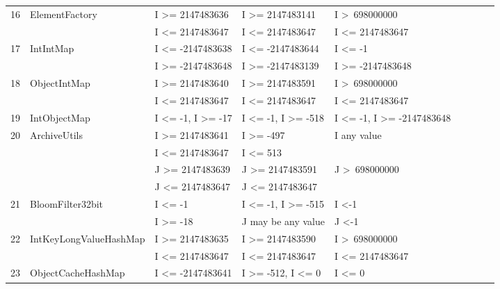 \documentclass[runningheads,a4paper]{llncs}
\begin{document}
\begin{table}[h]
{{\begin{tabular}{|l|l|l|l|l|l|l|l|l|}
16	& ElementFactory				& I \textgreater= 2147483636				& I \textgreater= 2147483141			& I \textgreater~698000000					\\ 
	&                                             & I \textless= 2147483647					& I \textless= 2147483647				& I \textless= 2147483647  					\\	
17	& IntIntMap					& I \textless= -2147483638					& I \textless= -2147483644				& I \textless= -1								\\ 
	&                                             & I \textgreater= -2147483648				& I \textgreater= -2147483139			& I \textgreater= -2147483648 				\\	
18	& ObjectIntMap				& I \textgreater= 2147483640				& I \textgreater= 2147483591			& I \textgreater~698000000					\\ 
	&                                             & I \textless= 2147483647					& I \textless= 2147483647				& I \textless= 2147483647					\\	
19	& IntObjectMap				& I \textless= -1, I \textgreater= -17			& I \textless= -1, I \textgreater= -518		& I \textless= -1, I \textgreater= -2147483648\\ 
20	& ArchiveUtils				& I \textgreater= 2147483641				& I \textgreater= -497					& I any value									\\ 
	&							&  I \textless= 2147483647					& I \textless= 513						& 											\\ 
	&                                             & J \textgreater= 2147483639				& J \textgreater= 2147483591			& J \textgreater~698000000 	   				\\
	&                                             &  J \textless= 2147483647					&  J \textless= 2147483647				&  	   										\\
21	& BloomFilter32bit 			& I \textless= -1								& I \textless= -1, I \textgreater= -515		& I \textless -1 								\\ 
	&                                             & I \textgreater= -18							& J may be any value						& J \textless -1 			   					\\	
22	& IntKeyLongValueHashMap	& I \textgreater= 2147483635				& I \textgreater= 2147483590			& I \textgreater~698000000					\\ 
	&                                             & I \textless= 2147483647					& I \textless= 2147483647				& I \textless= 2147483647					\\	
23	& ObjectCacheHashMap		& I \textless= -2147483641					& I \textgreater= -512, I \textless= 0		& I \textless= 0								\\ 

\end{tabular}}}
\end{table}
\end{document}
